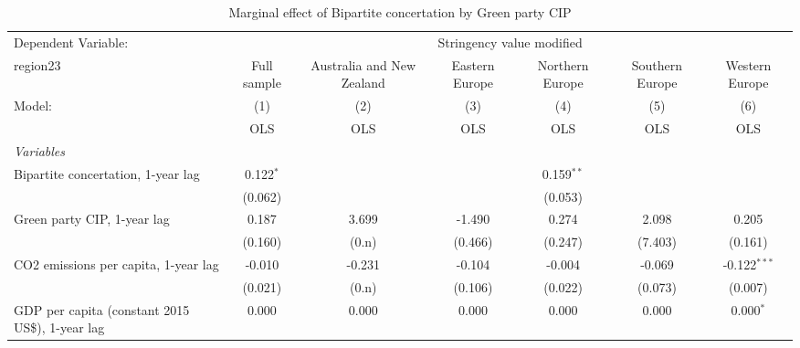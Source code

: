 
\begin{table}[htbp]
   \caption{Marginal effect of Bipartite concertation by Green party CIP}
   \centering
   \begin{tabular}{lcccccc}
      \toprule
      Dependent Variable: & \multicolumn{6}{c}{Stringency value modified}\\
      region23                                                         & Full sample   & Australia and New Zealand & Eastern Europe & Northern Europe & Southern Europe & Western Europe \\   
      Model:                                                           & (1)           & (2)                       & (3)            & (4)             & (5)             & (6)\\  
                                                                       &  OLS          & OLS                       & OLS            & OLS             & OLS             & OLS\\  
      \midrule
      \emph{Variables}\\
      Bipartite concertation, 1-year lag                               & 0.122$^{*}$   &                           &                & 0.159$^{**}$    &                 &   \\   
                                                                       & (0.062)       &                           &                & (0.053)         &                 &   \\   
      Green party CIP, 1-year lag                                      & 0.187         & 3.699                     & -1.490         & 0.274           & 2.098           & 0.205\\   
                                                                       & (0.160)       & (0.n)                     & (0.466)        & (0.247)         & (7.403)         & (0.161)\\   
      CO2 emissions per capita, 1-year lag                             & -0.010        & -0.231                    & -0.104         & -0.004          & -0.069          & -0.122$^{***}$\\   
                                                                       & (0.021)       & (0.n)                     & (0.106)        & (0.022)         & (0.073)         & (0.007)\\   
      GDP per capita (constant 2015 US\$), 1-year lag                  & 0.000         & 0.000                     & 0.000          & 0.000           & 0.000           & 0.000$^{*}$\\   

\end{tabular}
\end{table}

